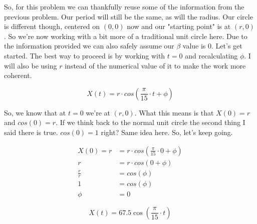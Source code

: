 \documentclass[10pt,letterpaper]{amspset}
\begin{document}
\begin{solution}
    
    So, for this problem we can thankfully reuse some of the information from the previous problem. Our period will still be the same, as will the radius. Our circle is different though, centered on $(0,0)$ now and our "starting point" is at $(r,0)$. So we're now working with a bit more of a traditional unit circle here. Due to the information provided we can also safely assume our $\beta$ value is 0. Let's get started. The best way to proceed is by working with $t = 0$ and recalculating $\phi$. I will also be using $r$ instead of the numerical value of it to make the work more coherent. 
    
    \[X(t) = r \cdot cos \left( \frac{\pi}{15} \cdot t + \phi \right)\]
    
    So, we know that at $t=0$ we're at $(r, 0)$. What this means is that $X(0) = r$ and $cos(0) = r$. If we think back to the normal unit circle the second thing I said there is true. $cos(0) = 1$ right? Same idea here. So, let's keep going.
    
    \begin{align}
    X(0) = r &= r \cdot cos \left( \frac{\pi}{15} \cdot 0 + \phi \right) \\
    r &= r \cdot cos \left(0 + \phi \right) \\
    \frac{r}{r} &= cos(\phi) \\
    1 &= cos(\phi) \\
    \phi &= 0 
    \end{align}
    
    \[\boxed{X(t) = 67.5 \cos \left( \frac{\pi}{15} \cdot t \right)} \]
    

\end{solution}
\end{document}
